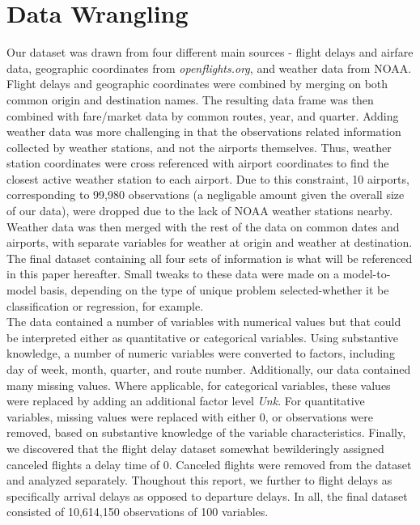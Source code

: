 \documentclass[12pt, a4paper, openany]{book}
\newcommand\tab[1][1cm]{\hspace*{#1}}
\begin{document}
	\section{Data Wrangling}
	\tab Our dataset was drawn from four different main sources - flight delays and airfare data, geographic coordinates from \textit{openflights.org}, and weather data from NOAA. Flight delays and geographic coordinates were combined by merging on both common origin and destination names. The resulting data frame was then combined with fare/market data by common routes, year, and quarter. Adding weather data was more challenging in that the observations related information collected by weather stations, and not the airports themselves. Thus, weather station coordinates were cross referenced with airport coordinates to find the closest active weather station to each airport. Due to this constraint, 10 airports, corresponding to 99,980 observations (a negligable amount given the overall size of our data), were dropped due to the lack of NOAA weather stations nearby. Weather data was then merged with the rest of the data on common dates and airports, with separate variables for weather at origin and weather at destination. The final dataset containing all four sets of information is what will be referenced in this paper hereafter. Small tweaks to these data were made on a model-to-model basis, depending on the type of unique problem selected-whether it be classification or regression, for example. \\
	\tab The data contained a number of variables with numerical values but that could be interpreted either as quantitative or categorical variables. Using substantive knowledge, a number of numeric variables were converted to factors, including day of week, month, quarter, and route number. Additionally, our data contained many missing values. Where applicable, for categorical variables, these values were replaced by adding an additional factor level \textit{Unk}. For quantitative variables, missing values were replaced with either 0, or observations were removed, based on substantive knowledge of the variable characteristics. Finally, we discovered that the flight delay dataset somewhat bewilderingly assigned canceled flights a delay time of 0. Canceled flights were removed from the dataset and analyzed separately. Thoughout this report, we further to flight delays as specifically arrival delays as opposed to departure delays. In all, the final dataset consisted of 10,614,150 observations of 100 variables. 
\end{document}
